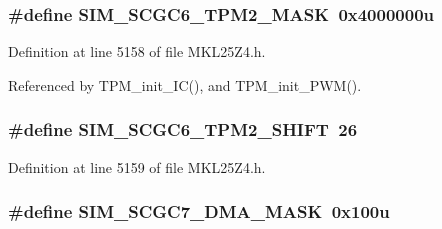 \subsubsection[{\texorpdfstring{S\+I\+M\+\_\+\+S\+C\+G\+C6\+\_\+\+T\+P\+M2\+\_\+\+M\+A\+SK}{SIM_SCGC6_TPM2_MASK}}]{\setlength{\rightskip}{0pt plus 5cm}\#define S\+I\+M\+\_\+\+S\+C\+G\+C6\+\_\+\+T\+P\+M2\+\_\+\+M\+A\+SK~0x4000000u}\hypertarget{group___s_i_m___register___masks_ga6e18a8c1e42f318d03294d14df255132}{}\label{group___s_i_m___register___masks_ga6e18a8c1e42f318d03294d14df255132}


Definition at line 5158 of file M\+K\+L25\+Z4.\+h.



Referenced by T\+P\+M\+\_\+init\+\_\+\+I\+C(), and T\+P\+M\+\_\+init\+\_\+\+P\+W\+M().

\subsubsection[{\texorpdfstring{S\+I\+M\+\_\+\+S\+C\+G\+C6\+\_\+\+T\+P\+M2\+\_\+\+S\+H\+I\+FT}{SIM_SCGC6_TPM2_SHIFT}}]{\setlength{\rightskip}{0pt plus 5cm}\#define S\+I\+M\+\_\+\+S\+C\+G\+C6\+\_\+\+T\+P\+M2\+\_\+\+S\+H\+I\+FT~26}\hypertarget{group___s_i_m___register___masks_gafc1cb84a2b2b306b043c31ed98213ff0}{}\label{group___s_i_m___register___masks_gafc1cb84a2b2b306b043c31ed98213ff0}


Definition at line 5159 of file M\+K\+L25\+Z4.\+h.

\subsubsection[{\texorpdfstring{S\+I\+M\+\_\+\+S\+C\+G\+C7\+\_\+\+D\+M\+A\+\_\+\+M\+A\+SK}{SIM_SCGC7_DMA_MASK}}]{\setlength{\rightskip}{0pt plus 5cm}\#define S\+I\+M\+\_\+\+S\+C\+G\+C7\+\_\+\+D\+M\+A\+\_\+\+M\+A\+SK~0x100u}\hypertarget{group___s_i_m___register___masks_gac559e129885604991932101719e3b368}{}\label{group___s_i_m___register___masks_gac559e129885604991932101719e3b368}


